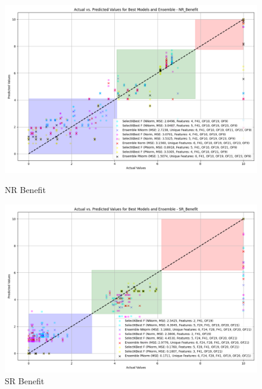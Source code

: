 \begin{figure}[H]
    \centering
    \begin{minipage}{0.45\textwidth}
        \centering
        \includegraphics[width=\linewidth]{reg_section_specific/featred_ensemble_learning/actual_vs_predicted_best_feature_selection_and_ensemble_NR_Benefit_10.png}
        \caption{NR Benefit}
        \label{reg_spec_fig:nr_ben_featred}
    \end{minipage}\hfill
    \begin{minipage}{0.45\textwidth}
        \centering
        \includegraphics[width=\linewidth]{reg_section_specific/featred_ensemble_learning/actual_vs_predicted_best_feature_selection_and_ensemble_SR_Benefit_10.png}
        \caption{SR Benefit}
        \label{reg_spec_fig:sr_ben_featred}
    \end{minipage}
\end{figure}

